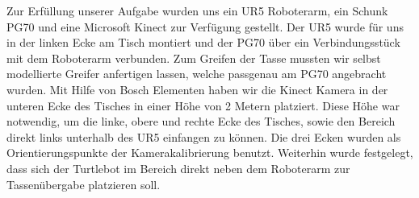 Zur Erfüllung unserer Aufgabe wurden uns ein UR5 Roboterarm, ein Schunk PG70 und eine Microsoft Kinect zur Verfügung gestellt. Der UR5 wurde für uns in der linken Ecke am Tisch montiert und der PG70 über ein Verbindungsstück mit dem Roboterarm verbunden. Zum Greifen der Tasse mussten wir selbst modellierte Greifer anfertigen lassen, welche passgenau am PG70 angebracht wurden. Mit Hilfe von Bosch Elementen haben wir die Kinect Kamera in der unteren Ecke des Tisches in einer Höhe von 2 Metern platziert. Diese Höhe war notwendig, um die linke, obere und rechte Ecke des Tisches, sowie den Bereich direkt links unterhalb des UR5 einfangen zu können. Die drei Ecken wurden als Orientierungspunkte der Kamerakalibrierung benutzt. Weiterhin wurde festgelegt, dass sich der Turtlebot im Bereich direkt neben dem Roboterarm zur Tassenübergabe platzieren soll.
